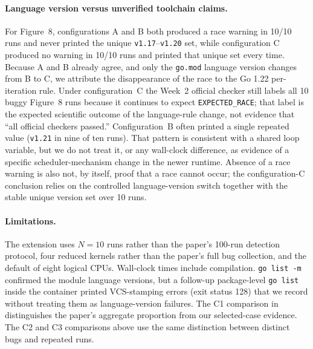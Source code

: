 \paragraph{Language version versus unverified toolchain claims.}
For Figure~8, configurations A and B both produced a race warning in 10/10
runs and never printed the unique \texttt{v1.17}--\texttt{v1.20} set, while
configuration C produced no warning in 10/10 runs and printed that unique
set every time. Because A and B already agree, and only the \texttt{go.mod}
language version changes from B to C, we attribute the disappearance of the
race to the Go 1.22 per-iteration rule. Under configuration~C the Week~2
official checker still labels all 10 buggy Figure~8 runs
 because it continues to expect
\texttt{EXPECTED\_RACE}; that label is the expected scientific outcome of the
language-rule change, not evidence that ``all official checkers passed.''
Configuration~B often printed a
single repeated value (\texttt{v1.21} in nine of ten runs). That pattern is
consistent with a shared loop variable, but we do not treat it, or any
wall-clock difference, as evidence of a specific scheduler-mechanism change
in the newer runtime. Absence of a race warning is also not, by itself,
proof that a race cannot occur; the configuration-C conclusion relies on the
controlled language-version switch together with the stable unique version
set over 10 runs.

\paragraph{Limitations.}
The extension uses $N=10$ runs rather than the paper's 100-run detection
protocol, four reduced kernels rather than the paper's full bug collection,
and the default of eight logical CPUs. Wall-clock times include compilation.
\texttt{go list -m} confirmed the module language versions, but a follow-up
package-level \texttt{go list} inside the container printed VCS-stamping
errors (exit status 128) that we record without treating them as
language-version failures. The C1 comparison in  distinguishes the paper's
aggregate proportion from our selected-case evidence. The C2 and C3 comparisons above use the same distinction between distinct bugs and repeated runs.
